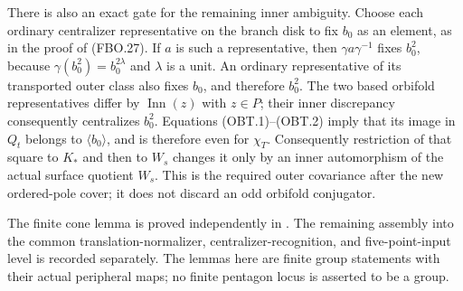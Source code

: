 There is also an exact gate for the remaining inner ambiguity.
Choose each ordinary centralizer representative on the branch
disk to fix $b_0$ as an element, as in the proof of (FBO.27).
If $a$ is such a representative, then
$\gamma a\gamma^{-1}$ fixes $b_0^2$, because
$\gamma(b_0^2)=b_0^{2\lambda}$ and $\lambda$ is a unit.
An ordinary representative of its transported outer class
also fixes $b_0$, and therefore $b_0^2$.
The two based orbifold representatives differ by
$\operatorname{Inn}(z)$ with $z\in P$; their inner
discrepancy consequently centralizes $b_0^2$.
Equations (OBT.1)--(OBT.2) imply that its
image in $Q_t$ belongs to $\langle b_0\rangle$, and is
therefore even for $\chi_T$.
Consequently restriction of that square to $K_*$ and then
to $W_s$ changes it only by an inner automorphism of
the actual surface quotient $W_s$.
This is the required outer covariance after the new
ordered-pole cover; it does not discard an odd orbifold
conjugator.

The finite cone lemma is proved independently in
.
The remaining assembly into the common translation-normalizer,
centralizer-recognition, and five-point-input level is recorded
separately.  The lemmas here are finite group statements with
their actual peripheral maps; no finite pentagon locus is
asserted to be a group.
